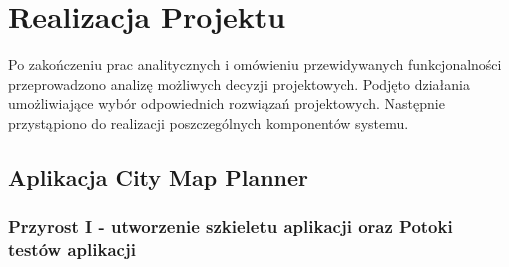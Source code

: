 
\chapter{Realizacja Projektu}
\label{ch:realizacja}
Po zakończeniu prac analitycznych i omówieniu przewidywanych funkcjonalności przeprowadzono analizę możliwych decyzji projektowych. Podjęto działania umożliwiające wybór odpowiednich rozwiązań projektowych. 
Następnie przystąpiono do realizacji poszczególnych komponentów systemu.

\section{Aplikacja City Map Planner}
\label{sec:aplikacja}

\subsection{Przyrost I - utworzenie szkieletu aplikacji oraz Potoki testów aplikacji}
\label{sec:przyrost1}

